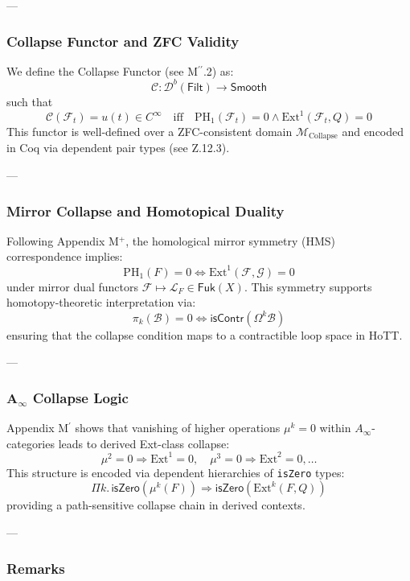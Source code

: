 \documentclass[11pt]{article}
\begin{document}
\begin{axiom}
\begin{axiom}
{{---

\subsubsection*{Collapse Functor and ZFC Validity}

We define the Collapse Functor (see M$^{\prime\prime}$.2) as:
\[
\mathcal{C} : \mathcal{D}^b(\mathsf{Filt}) \to \mathsf{Smooth}
\]
such that
\[
\mathcal{C}(\mathcal{F}_t) = u(t) \in C^\infty \quad \text{iff} \quad \mathrm{PH}_1(\mathcal{F}_t) = 0 \land \mathrm{Ext}^1(\mathcal{F}_t, Q) = 0
\]
This functor is well-defined over a ZFC-consistent domain \(\mathcal{M}_{\text{Collapse}}\)  
and encoded in Coq via dependent pair types (see Z.12.3).

---

\subsubsection*{Mirror Collapse and Homotopical Duality}

Following Appendix M$^+$, the homological mirror symmetry (HMS) correspondence implies:
\[
\mathrm{PH}_1(F) = 0 \iff \mathrm{Ext}^1(\mathcal{F}, \mathcal{G}) = 0
\]
under mirror dual functors \( \mathcal{F} \mapsto \mathcal{L}_F \in \mathsf{Fuk}(X) \).  
This symmetry supports homotopy-theoretic interpretation via:
\[
\pi_k(\mathcal{B}) = 0 \iff \mathsf{isContr}(\Omega^k \mathcal{B})
\]
ensuring that the collapse condition maps to a contractible loop space in HoTT.

---

\subsubsection*{A$_\infty$ Collapse Logic}

Appendix M$^\prime$ shows that vanishing of higher operations \(\mu^k = 0\)  
within \( A_\infty \)-categories leads to derived Ext-class collapse:
\[
\mu^2 = 0 \Rightarrow \mathrm{Ext}^1 = 0, \quad \mu^3 = 0 \Rightarrow \mathrm{Ext}^2 = 0, \dots
\]
This structure is encoded via dependent hierarchies of \texttt{isZero} types:
\[
\Pi k.\, \mathsf{isZero}(\mu^k(F)) \Rightarrow \mathsf{isZero}(\mathrm{Ext}^k(F, Q))
\]
providing a path-sensitive collapse chain in derived contexts.

---

\subsubsection*{Remarks}

}}
\end{axiom}
\end{axiom}
\end{document}
